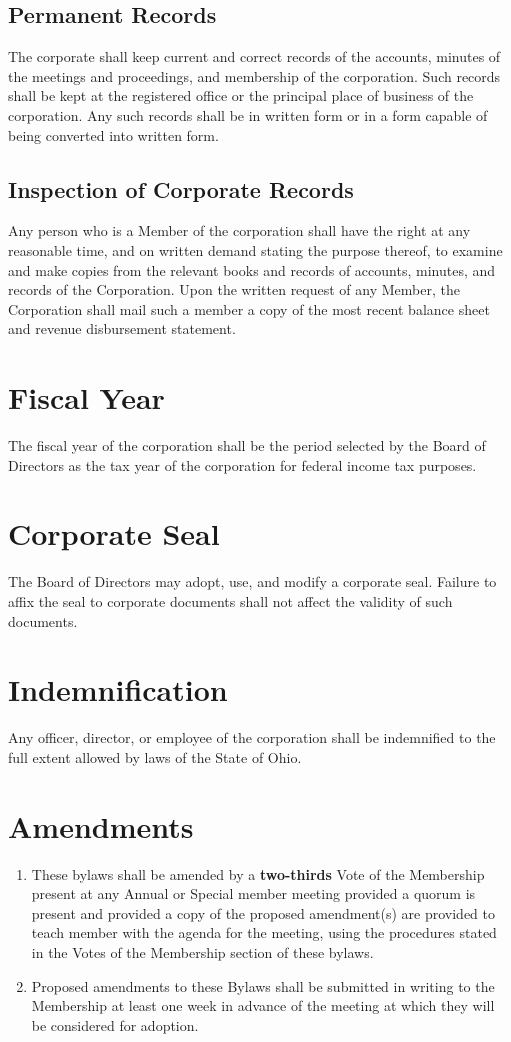 \documentclass{article}
\begin{document}
  \subsection{Permanent Records}
  The corporate shall keep current and correct records of the accounts, minutes of the
  meetings and proceedings, and membership of the corporation.  Such records shall be kept
  at the registered office or the principal place of business of the corporation.  Any such
  records shall be in written form or in a form capable of being converted into written form.
  \subsection{Inspection of Corporate Records}
  Any person who is a Member of the corporation shall have the right at any reasonable time,
  and on written demand stating the purpose thereof, to examine and make copies from the
  relevant books and records of accounts, minutes, and records of the Corporation.  Upon
  the written request of any Member, the Corporation shall mail such a member a copy of the
  most recent balance sheet and revenue disbursement statement.
\section{Fiscal Year}
  The fiscal year of the corporation shall be the period selected by the Board of Directors as
  the tax year of the corporation for federal income tax purposes.
\section{Corporate Seal}
  The Board of Directors may adopt, use, and modify a corporate seal.  Failure to affix the
  seal to corporate documents shall not affect the validity of such documents.
\section{Indemnification}
  Any officer, director, or employee of the corporation shall be indemnified to the full extent
  allowed by laws of the State of Ohio.
\section{Amendments}
  \begin{enumerate}
    \item These bylaws shall be amended by a \textbf{two-thirds} Vote of the Membership present at
    any Annual or Special member meeting provided a quorum is present and provided a copy
    of the proposed amendment(s) are provided to teach member with the agenda for the
    meeting, using the procedures stated in the Votes of the Membership section of these
    bylaws.
    \item Proposed amendments to these Bylaws shall be submitted in writing to the
    Membership at least one week in advance of the meeting at which they will be considered
    for adoption.
  \end{enumerate}
\end{document}
